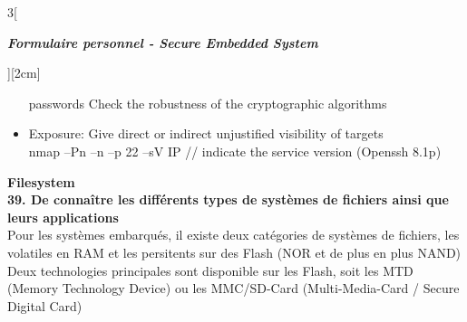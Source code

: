 \begin{multicols}{3}[\centerline{ \large\em \textbf{Formulaire personnel - Secure Embedded System}}][2cm]
\begin{itemize}
passwords
Check the robustness of the cryptographic algorithms
\item Exposure: Give direct or indirect unjustified visibility of targets\\
nmap –Pn –n –p 22 –sV IP // indicate the service version
(Openssh 8.1p)
\end{itemize}
{\Large \textbf{Filesystem}}
\\ \textbf{39. De connaître les différents types de systèmes de fichiers ainsi que leurs applications\\}
Pour les systèmes embarqués, il existe deux catégories de systèmes de fichiers, les volatiles en RAM et les persitents sur des Flash (NOR et de plus en plus NAND)\\
Deux technologies principales sont disponible sur les Flash, soit les MTD (Memory Technology Device) ou les MMC/SD-Card (Multi-Media-Card / Secure Digital Card)\\


\end{multicols}
